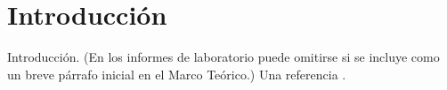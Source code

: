 \section{Introducción}
\label{sec:Introduccion}
Introducción. (En los informes de laboratorio puede omitirse si se incluye como un breve párrafo inicial en el Marco Teórico.) Una referencia \citep{buckley1985design}.
